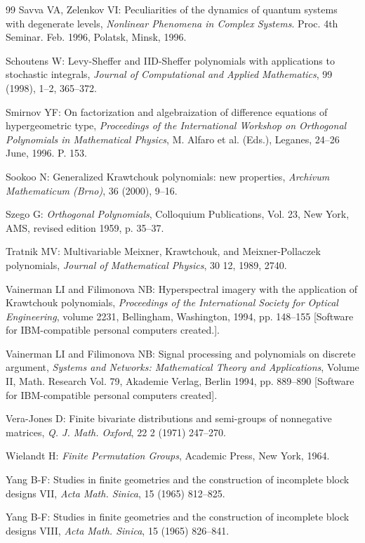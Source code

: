 \begin{thebibliography}{99}
 Savva VA, Zelenkov VI: Peculiarities of the dynamics of quantum systems with degenerate levels, \emph{Nonlinear Phenomena in Complex Systems}. Proc. 4th Seminar. Feb. 1996, Polatsk, Minsk, 1996.

 Schoutens W: Levy-Sheffer and IID-Sheffer polynomials with applications to stochastic integrals, \emph{Journal of Computational and Applied Mathematics}, 99 (1998), 1--2, 365--372.

 Smirnov YF: On factorization and algebraization of difference equations of hypergeometric type, \emph{Proceedings of the International Workshop on Orthogonal Polynomials in Mathematical Physics}, M. Alfaro et al. (Eds.), Leganes, 24--26 June, 1996. P. 153.

 Sookoo N: Generalized Krawtchouk polynomials: new properties, \emph{Archivum Mathematicum (Brno)}, 36 (2000), 9--16.

 Szego G: \emph{Orthogonal Polynomials}, Colloquium Publications, Vol. 23, New York, AMS, revised edition 1959, p. 35--37.

 Tratnik MV: Multivariable Meixner, Krawtchouk, and Meixner-Pollaczek polynomials, \emph{Journal of Mathematical Physics}, 30 12, 1989, 2740.

 Vainerman LI and Filimonova NB: Hyperspectral imagery with the application of Krawtchouk polynomials, \emph{Proceedings of the International Society for Optical Engineering}, volume 2231, Bellingham, Washington, 1994, pp. 148--155 [Software for IBM-compatible personal computers created.].

 Vainerman LI and Filimonova NB: Signal processing and polynomials on discrete argument, \emph{Systems and Networks: Mathematical Theory and Applications}, Volume II, Math. Research Vol. 79, Akademie Verlag, Berlin 1994, pp. 889--890 [Software for IBM-compatible personal computers created].

 Vera-Jones D: Finite bivariate distributions and semi-groups of nonnegative matrices, \emph{Q. J. Math. Oxford}, 22 2 (1971) 247--270.

 Wielandt H: \emph{Finite Permutation Groups}, Academic Press, New York, 1964.

 Yang B-F: Studies in finite geometries and the construction of incomplete block designs VII, \emph{Acta Math. Sinica}, 15 (1965) 812--825.

 Yang B-F: Studies in finite geometries and the construction of incomplete block designs VIII, \emph{Acta Math. Sinica}, 15 (1965) 826--841.


\end{thebibliography}
